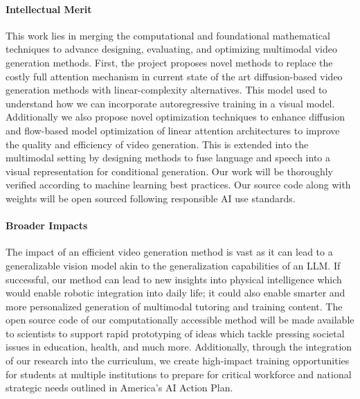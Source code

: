 \paragraph{Intellectual Merit} 
This work lies in merging the computational and foundational mathematical techniques to advance designing, evaluating, and optimizing multimodal video generation methods. First, the project proposes novel methods to replace the costly full attention mechanism in current state of the art diffusion-based video generation methods with linear-complexity alternatives. This model used to understand how we can incorporate autoregressive training in a visual model. Additionally we also propose  novel optimization techniques to enhance diffusion and flow-based model optimization of linear attention architectures to improve the quality and efficiency of video generation. This is extended into the multimodal setting by designing methods to fuse language and speech into a visual representation for conditional generation. Our work will be thoroughly verified according to machine learning best practices. Our source code along with weights will be open sourced following responsible AI use standards. 

\paragraph{Broader Impacts} 

The impact of an efficient video generation method is vast as it can lead to a generalizable vision model akin to the generalization capabilities of an LLM. If successful, our method can lead to new insights into physical intelligence which would enable robotic integration into daily life; it could also enable smarter and more personalized generation of multimodal tutoring and training content. The open source code of our computationally accessible method will be made available to scientists to support rapid prototyping of ideas which tackle pressing societal issues in education, health, and much more. Additionally, through the integration of our research into the curriculum, we create high-impact training opportunities for students at multiple institutions to prepare for critical workforce and national strategic needs outlined in America's AI Action Plan.
